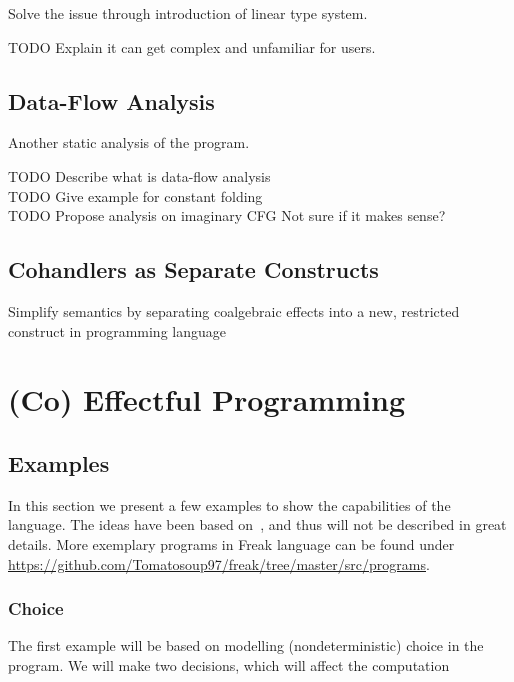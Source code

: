 \documentclass[declaration,shortabstract]{iithesis}
\theoremstyle{definition} \newtheorem{definition}{Definition}[chapter]
\theoremstyle{remark} \newtheorem{remark}[definition]{Observation}
\theoremstyle{plain} \newtheorem{theorem}[definition]{Theorem}
\theoremstyle{plain} \newtheorem{lemma}[definition]{Lemma}
\begin{document}
Solve the issue through introduction of linear type system.

TODO Explain it can get complex and unfamiliar for users.

\section{Data-Flow Analysis}

Another static analysis of the program.

TODO Describe what is data-flow analysis \\

TODO Give example for constant folding \\

TODO Propose analysis on imaginary CFG Not sure if it makes sense?

\section{Cohandlers as Separate Constructs}

Simplify semantics by separating coalgebraic effects into a new, restricted
construct in programming language

\chapter{(Co) Effectful Programming}  %
\section{Examples}\label{sec:examples}

    In this section we present a few examples to show the capabilities of the language.
    The ideas have been based on~\cite{programming-in-eff}, and thus will not be
    described in great details. More exemplary programs in Freak language can
    be found under \\ \href{https://github.com/Tomatosoup97/freak/tree/master/src/programs}{\underline{https://github.com/Tomatosoup97/freak/tree/master/src/programs}}.

    \subsection{Choice}\label{sec:choice-example}

    The first example will be based on modelling (nondeterministic) choice
    in the program. We will make two decisions, which will affect the computation
\end{document}
